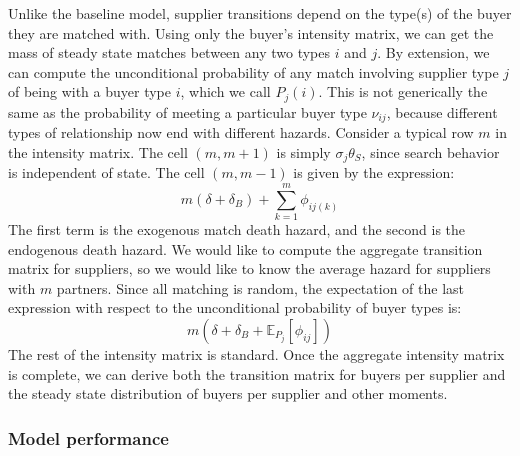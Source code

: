 \documentclass[12pt]{article} \usepackage{amsmath,amssymb,amsthm,geometry,graphicx,setspace,algorithm,algpseudocode,float}
\begin{document}
Unlike the baseline model, supplier transitions depend on the type(s) of the buyer they are matched with.  Using only the buyer's intensity matrix, we can get the mass of steady state matches between any two types $i$ and $j$. By extension, we can compute the unconditional probability of any match involving supplier type $j$ of being with a buyer type $i$, which we call $P_j(i)$.  This is not generically the same as the probability of meeting a particular buyer type $\nu_{ij}$, because different types of relationship now end with different hazards.  Consider a typical row $m$ in the intensity matrix.  The cell $(m,m+1)$ is simply $\sigma_j \theta_S$, since search behavior is independent of state.  The cell $(m,m-1)$ is given by the expression:
\begin{equation*}
    m(\delta + \delta_B) + \sum_{k=1}^m \phi_{ij(k)}
\end{equation*}
The first term is the exogenous match death hazard, and the second is the endogenous death hazard.  We would like to compute the aggregate transition matrix for suppliers, so we would like to know the average hazard for suppliers with $m$ partners.  Since all matching is random, the expectation of the last expression with respect to the unconditional probability of buyer types is:
\begin{equation*}
    m\left(\delta + \delta_B + \mathbb{E}_{P_j}\left[\phi_{ij}\right]\right)
\end{equation*}
The rest of the intensity matrix is standard.  Once the aggregate intensity matrix is complete, we can derive both the transition matrix for buyers per supplier and the steady state distribution of buyers per supplier and other moments.

\subsubsection{Model performance}
\end{document}
